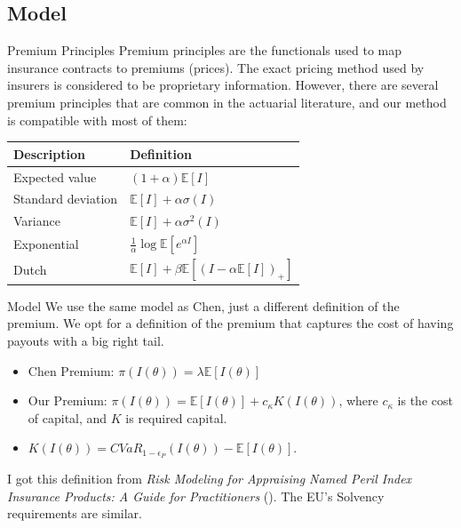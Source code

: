 \documentclass{beamer}
\begin{document}
\subsection{Model}
\begin{frame}{Premium Principles}
    Premium principles are the functionals used to map insurance contracts to premiums (prices). The exact pricing method used by insurers is considered to be proprietary information. However, there are several premium principles that are common in the actuarial literature, and our method is compatible with most of them:
    \begin{table}[h!]
        \centering
        \begin{tabular}{ll}
        Description & Definition \\ \hline
        Expected value       & $(1+\alpha)\mathbb{E}[I]$           \\
        Standard deviation   & $\mathbb{E}[I] + \alpha \sigma(I)$       \\
        Variance             & $\mathbb{E}[I] + \alpha \sigma^2(I)$      \\
        Exponential          & $\frac{1}{\alpha} \log \mathbb{E}[e^{\alpha I}]$    \\
        Dutch                &  $\mathbb{E}[I] + \beta \mathbb{E}[(I-\alpha \mathbb{E}[I])_+]$                   \\ \hline
        \end{tabular}
        \end{table}
\end{frame}

\begin{frame}{Model}
    We use the same model as Chen, just a different definition of the premium. We opt for a definition of the premium that captures the cost of having payouts with a big right tail. 
    \vspace*{1em}
    \begin{itemize}
        \setlength\itemsep{2em}
        \item Chen Premium: $\pi(I(\theta)) = \lambda \mathbb{E}[I(\theta)]$
        \item Our Premium: $\pi(I(\theta)) = \mathbb{E}[I(\theta)] + c_{\kappa} K(I(\theta))$, where $c_{\kappa}$ is the cost of capital, and $K$ is required capital.
    \item $K(I(\theta)) = CVaR_{1-\epsilon_P}\left ( I(\theta) \right ) - \mathbb{E}[I(\theta)]$.
    \end{itemize}
    \vspace*{1em}
    I got this definition from \textit{Risk Modeling for Appraising Named Peril Index Insurance Products: A Guide for Practitioners} (\cite{mapfumo2017risk}). The EU's Solvency requirements are similar. 
\end{frame}
\end{document}
